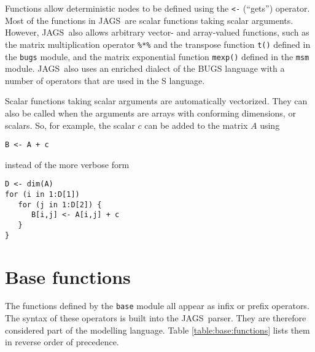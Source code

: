 \documentclass[11pt, a4paper, titlepage]{report}
\newcommand{\JAGS}{\textsf{JAGS}}
\begin{document}
Functions allow deterministic nodes to be defined using the \verb+<-+
(``gets'') operator.  Most of the functions in \JAGS\ are scalar
functions taking scalar arguments. However, \JAGS\ also allows
arbitrary vector- and array-valued functions, such as the matrix
multiplication operator \verb+%*%+ and the transpose function
\verb+t()+ defined in the \verb+bugs+ module, and the matrix
exponential function \verb+mexp()+ defined in the \verb+msm+
module. \JAGS\ also uses an enriched dialect of the BUGS language with
a number of operators that are used in the S language.

Scalar functions taking scalar arguments are automatically vectorized.
They can also be called when the arguments are arrays with conforming
dimensions, or scalars. So, for example, the scalar $c$ can be added to
the matrix $A$ using
\begin{verbatim}
B <- A + c
\end{verbatim}
instead of the more verbose form
\begin{verbatim}
D <- dim(A)
for (i in 1:D[1])
   for (j in 1:D[2]) {
      B[i,j] <- A[i,j] + c
   }
}
\end{verbatim}

\section{Base functions}
\label{section:functions:base}

The functions defined by the \verb+base+ module all appear as infix or
prefix operators. The syntax of these operators is built into the
\JAGS\ parser. They are therefore considered part of the modelling
language.  Table \ref{table:base:functions} lists them in reverse
order of precedence.
\end{document}
